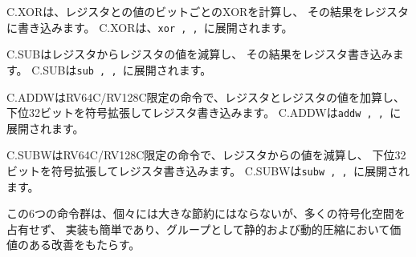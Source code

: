 \begin{comment}
C.XOR computes the bitwise XOR of the values in registers {\em \rdprime}
and {\em \rstwoprime}, then writes the result to register {\em \rdprime}.
C.XOR expands into {\tt xor \rdprime, \rdprime, \rstwoprime}.
\end{comment}
C.XORは、レジスタ{\em \rdprime}と{\em \rstwoprime}の値のビットごとのXORを計算し、
その結果をレジスタ{\em \rdprime}に書き込みます。
C.XORは、{\tt xor \rdprime, \rdprime, \rstwoprime}に展開されます。

\begin{comment}
C.SUB subtracts the value in register {\em \rstwoprime} from the value in
register {\em \rdprime}, then writes the result to register {\em \rdprime}.
C.SUB expands into {\tt sub \rdprime, \rdprime, \rstwoprime}.
\end{comment}
C.SUBはレジスタ{\em \rdprime}からレジスタ{\em \rstwoprime}の値を減算し、
その結果をレジスタ{\em \rdprime}書き込みます。
C.SUBは{\tt sub \rdprime, \rdprime, \rstwoprime}に展開されます。

\begin{comment}
C.ADDW is an RV64C/RV128C-only instruction that adds the values in
registers {\em \rdprime} and {\em \rstwoprime}, then sign-extends the lower
32 bits of the sum before writing the result to register {\em \rdprime}.
C.ADDW expands into {\tt addw \rdprime, \rdprime, \rstwoprime}.
\end{comment}
C.ADDWはRV64C/RV128C限定の命令で、レジスタ{\em \rdprime}とレジスタ{\em \rstwoprime}の値を加算し、
下位32ビットを符号拡張してレジスタ{\em \rdprime}書き込みます。
C.ADDWは{\tt addw \rdprime, \rdprime, \rstwoprime}に展開されます。

\begin{comment}
C.SUBW is an RV64C/RV128C-only instruction that subtracts the value in
register {\em \rstwoprime} from the value in register {\em \rdprime}, then
sign-extends the lower 32 bits of the difference before writing the result
to register {\em \rdprime}. C.SUBW expands into {\tt subw \rdprime, \rdprime, \rstwoprime}.
\end{comment}
C.SUBWはRV64C/RV128C限定の命令で、レジスタ{\em \rdprime}から{\em \rstwoprime}の値を減算し、
下位32ビットを符号拡張してレジスタ{\em \rdprime}書き込みます。
C.SUBWは{\tt subw \rdprime, \rdprime, \rstwoprime}に展開されます。

\begin{commentary}
\begin{comment}
This group of six instructions do not provide large savings
individually, but do not occupy much encoding space and are
straightforward to implement, and as a group provide a worthwhile
improvement in static and dynamic compression.
\end{comment}
この6つの命令群は、個々には大きな節約にはならないが、多くの符号化空間を占有せず、
実装も簡単であり、グループとして静的および動的圧縮において価値のある改善をもたらす。
\end{commentary}

